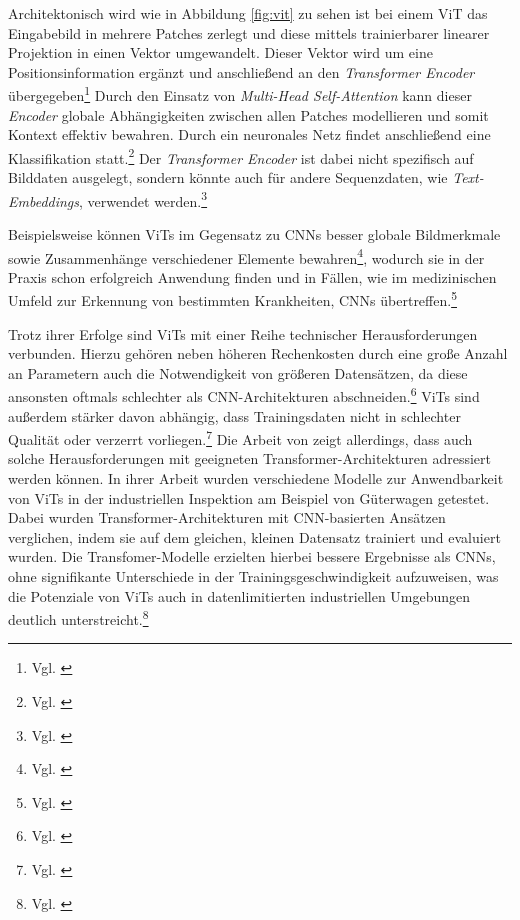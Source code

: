 Architektonisch wird wie in Abbildung \ref{fig:vit} zu sehen ist bei einem \ac{ViT} das Eingabebild in mehrere Patches zerlegt und diese mittels trainierbarer linearer Projektion in einen Vektor umgewandelt. Dieser Vektor wird um eine Positionsinformation ergänzt und anschließend an den \textit{Transformer Encoder} übergegeben\footnote{Vgl. \cite[3]{dosovitskiy_image_2020}} Durch den Einsatz von \textit{Multi-Head Self-Attention} kann dieser \textit{Encoder} globale Abhängigkeiten zwischen allen Patches modellieren und somit Kontext effektiv bewahren. Durch ein neuronales Netz findet anschließend eine Klassifikation statt.\footnote{Vgl. \cite[3]{dosovitskiy_image_2020}} Der \textit{Transformer Encoder} ist dabei nicht spezifisch auf Bilddaten ausgelegt, sondern könnte auch für andere Sequenzdaten, wie \textit{Text-Embeddings}, verwendet werden.\footnote{Vgl. \cite[3]{dosovitskiy_image_2020}}

Beispielsweise können \acfp{ViT} im Gegensatz zu \acp{CNN} besser globale Bildmerkmale sowie Zusammenhänge verschiedener Elemente bewahren\footnote{Vgl. \cite[S. 206]{berroukham_vision_2023}}, wodurch sie in der Praxis schon erfolgreich Anwendung finden und in Fällen, wie im medizinischen Umfeld zur Erkennung von bestimmten Krankheiten, \acp{CNN} übertreffen.\footnote{Vgl. \cite[S. 208]{berroukham_vision_2023}}

Trotz ihrer Erfolge sind \acp{ViT} mit einer Reihe technischer Herausforderungen verbunden. Hierzu gehören neben höheren Rechenkosten durch eine große Anzahl an Parametern auch die Notwendigkeit von größeren Datensätzen, da diese ansonsten oftmals schlechter als \ac{CNN}-Architekturen abschneiden.\footnote{Vgl. \cite[8]{jamil_comprehensive_2022}} \acp{ViT} sind außerdem stärker davon abhängig, dass Trainingsdaten nicht in schlechter Qualität oder verzerrt vorliegen.\footnote{Vgl. \cite[209]{berroukham_vision_2023}} Die Arbeit von \cite{hutten_vision_2022} zeigt allerdings, dass auch solche Herausforderungen mit geeigneten Transformer-Architekturen adressiert werden können. In ihrer Arbeit wurden verschiedene Modelle zur Anwendbarkeit von \acp{ViT} in der industriellen Inspektion am Beispiel von Güterwagen getestet. Dabei wurden Transformer-Architekturen mit \ac{CNN}-basierten Ansätzen verglichen, indem sie auf dem gleichen, kleinen Datensatz trainiert und evaluiert wurden. Die Transfomer-Modelle erzielten hierbei bessere Ergebnisse als \acp{CNN}, ohne signifikante Unterschiede in der Trainingsgeschwindigkeit aufzuweisen, was die Potenziale von \acp{ViT} auch in datenlimitierten industriellen Umgebungen deutlich unterstreicht.\footnote{Vgl. \cite{hutten_vision_2022}}

